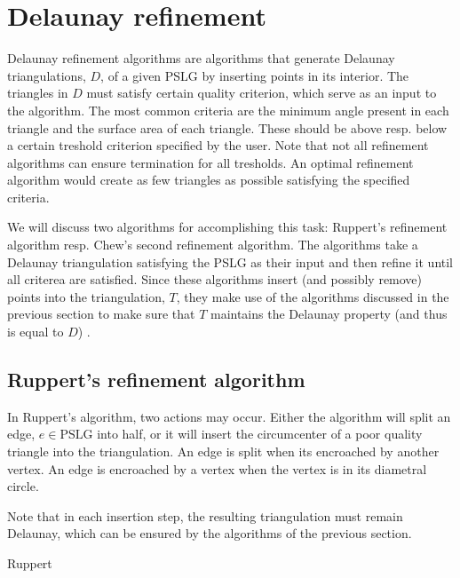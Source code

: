 \section{Delaunay refinement}
\label{sec:refinement}

Delaunay refinement algorithms are algorithms that generate Delaunay triangulations, $D$, of a given PSLG by inserting points in its interior.
The triangles in $D$ must satisfy certain quality criterion, which serve as an input to the algorithm.
The most common criteria are the minimum angle present in each triangle and the surface area of each triangle.
These should be above resp. below a certain treshold criterion specified by the user.
Note that not all refinement algorithms can ensure termination for all tresholds.
An optimal refinement algorithm would create as few triangles as possible satisfying the specified criteria.

We will discuss two algorithms for accomplishing this task: Ruppert's refinement algorithm resp. Chew's second refinement algorithm.
The algorithms take a Delaunay triangulation satisfying the PSLG as their input and then refine it until all criterea are satisfied.
Since these algorithms insert (and possibly remove) points into the triangulation, $T$, they make use of the algorithms discussed in the previous section
to make sure that $T$ maintains the Delaunay property (and thus is equal to $D$) \cite{shewchuk}.

\subsection{Ruppert's refinement algorithm}
\label{sub:ruppert}
\nocite{shewchuk2}

In Ruppert's algorithm, two actions may occur.
Either the algorithm will split an edge, $e \in \mathrm{PSLG}$ into half,
or it will insert the circumcenter of a poor quality triangle into the triangulation.
An edge is split when its encroached by another vertex.
An edge is encroached by a vertex when the vertex is in its diametral circle. \cite{shewchuk}

Note that in each insertion step, the resulting triangulation must remain Delaunay,
which can be ensured by the algorithms of the previous section.

\begin{algorithm}
    \caption{Ruppert}
    \begin{algorithmic}
                \Else
                \EndIf
            \EndWhile
        \EndFunction
    \end{algorithmic}
    \label{alg:Ruppert}
\end{algorithm}

